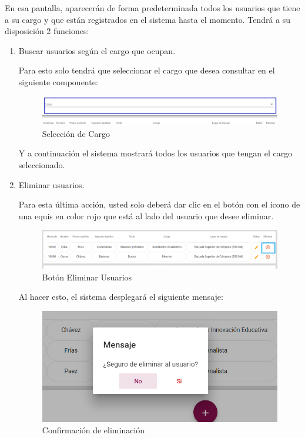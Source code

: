         En esa pantalla, aparecerán de forma predeterminada todos los usuarios que tiene a su cargo y que están registrados en el sistema hasta el momento. Tendrá a su disposición 2 funciones:
        \newpage
        \begin{enumerate}

            \item   Buscar usuarios según el cargo que ocupan.

                Para esto solo tendrá que seleccionar el cargo que desea consultar en el siguiente componente:

                \begin{figure}[!hbtp]
                    \centering
                    \hypertarget{cargo1}{\includegraphics[width=0.7\linewidth]{images/SP5/BtnCargo1}}
                    \caption{Selección de Cargo}
                    \label{cargo1}
                \end{figure}

                 Y a continuación el sistema mostrará todos los usuarios que tengan el cargo seleccionado.

			   \newpage

            \item Eliminar usuarios.

                Para esta última acción, usted solo deberá dar clic en el botón con el icono de una equis en color rojo que está al lado del usuario que desee  eliminar.

                \begin{figure}[!hbtp]
                    \centering
                    \hypertarget{eliminar}{\includegraphics[width=0.7\linewidth]{images/SP5/BtnEliminar}}
                    \caption{Botón Eliminar Usuarios}
                    \label{eliminar}
                \end{figure}

                Al hacer esto, el sistema desplegará el siguiente mensaje:

               \begin{figure}[!hbtp]
                	\centering
                	\includegraphics[width=0.4\linewidth]{images/SP5/MSG22}
               	\caption{Confirmación de eliminación}
               	\label{confirmarE}


\end{figure}
\end{enumerate}
